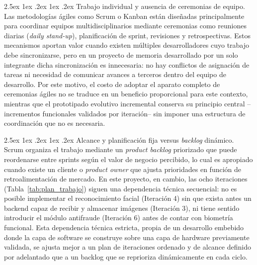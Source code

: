 \documentclass{iccmemoria}
\makeatletter
\renewcommand\paragraph{%
  \@startsection{paragraph}{4}{0pt}%
    {2.5ex \@plus 1ex \@minus .2ex}%
    {1ex \@plus .2ex}%
    {\normalfont\normalsize\bfseries}}
\makeatother
\begin{document}
\paragraph{Trabajo individual y ausencia de ceremonias de equipo.} Las metodologías ágiles como Scrum o Kanban están diseñadas principalmente para coordinar equipos multidisciplinarios mediante ceremonias como reuniones diarias (\textit{daily stand-up}), planificación de sprint, revisiones y retrospectivas. Estos mecanismos aportan valor cuando existen múltiples desarrolladores cuyo trabajo debe sincronizarse, pero en un proyecto de memoria desarrollado por un solo integrante dicha sincronización es innecesaria: no hay conflictos de asignación de tareas ni necesidad de comunicar avances a terceros dentro del equipo de desarrollo. Por este motivo, el costo de adoptar el aparato completo de ceremonias ágiles no se traduce en un beneficio proporcional para este contexto, mientras que el prototipado evolutivo incremental conserva su principio central --incrementos funcionales validados por iteración-- sin imponer una estructura de coordinación que no es necesaria.

\paragraph{Alcance y planificación fija versus \textit{backlog} dinámico.} Scrum organiza el trabajo mediante un \textit{product backlog} priorizado que puede reordenarse entre sprints según el valor de negocio percibido, lo cual es apropiado cuando existe un cliente o \textit{product owner} que ajusta prioridades en función de retroalimentación de mercado. En este proyecto, en cambio, las ocho iteraciones (Tabla~\ref{tab:plan_trabajo}) siguen una dependencia técnica secuencial: no es posible implementar el reconocimiento facial (Iteración 4) sin que exista antes un backend capaz de recibir y almacenar imágenes (Iteración 3), ni tiene sentido introducir el módulo antifraude (Iteración 6) antes de contar con biometría funcional. Esta dependencia técnica estricta, propia de un desarrollo embebido donde la capa de software se construye sobre una capa de hardware previamente validada, se ajusta mejor a un plan de iteraciones ordenado y de alcance definido por adelantado que a un backlog que se reprioriza dinámicamente en cada ciclo.
\end{document}
